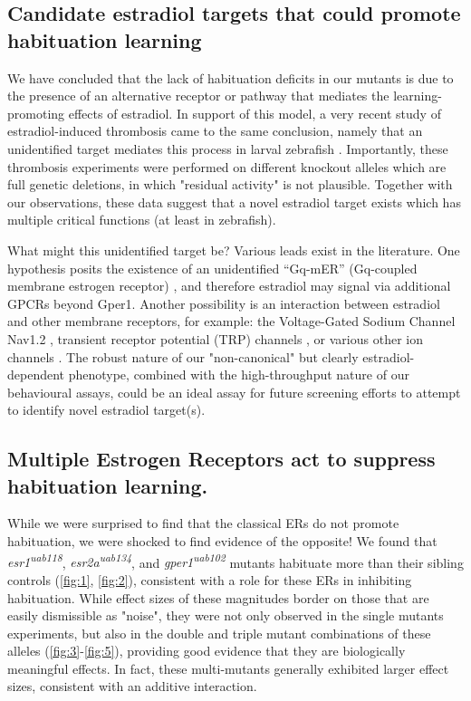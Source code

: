 \documentclass[9.5pt,lineno]{RandlettLab_elife}
\begin{document}
{\subsection{Candidate estradiol targets that could promote habituation learning}

We have concluded that the lack of habituation deficits in our mutants is due to the presence of an alternative receptor or pathway that mediates the learning-promoting effects of estradiol.
In support of this model, a very recent study of estradiol-induced thrombosis came to the same conclusion, namely that an unidentified target mediates this process in larval zebrafish \citep{Yu2024-hr}.
Importantly, these thrombosis experiments were performed on different knockout alleles which are full genetic deletions, in which "residual activity" is not plausible. 
Together with our observations, these data suggest that a novel estradiol target exists which has multiple critical functions (at least in zebrafish). 

What might this unidentified target be? 
Various leads exist in the literature. 
One hypothesis posits the existence of an unidentified “Gq-mER” (Gq-coupled membrane estrogen receptor) \citep{Qiu2006-ml, Vail2019-lx}, and therefore estradiol may signal via additional GPCRs beyond Gper1. 
Another possibility is an interaction between estradiol and other membrane receptors, for example: the Voltage-Gated Sodium Channel Nav1.2 \citep{Sula2021-vs, Trevino2021-wl}, transient receptor potential (TRP) channels \citep{Payrits2017-cd, Ramirez-Barrantes2020-iv}, or various other ion channels \citep{Kow2016-dl}.
The robust nature of our "non-canonical" but clearly estradiol-dependent phenotype, combined with the high-throughput nature of our behavioural assays, could be an ideal assay for future screening efforts to attempt to identify novel estradiol target(s). 

\subsection{Multiple Estrogen Receptors act to suppress habituation learning.}
 
While we were surprised to find that the classical ERs do not promote habituation, we were shocked to find evidence of the opposite!
We found that \emph{esr1\textsuperscript{uab118}}, \emph{esr2a\textsuperscript{uab134}},  and \emph{gper1\textsuperscript{uab102}} mutants habituate more than their sibling controls (\autoref{fig:1}, \autoref{fig:2}), consistent with a role for these ERs in inhibiting habituation.
While effect sizes of these magnitudes border on those that are easily dismissible as "noise", they were not only observed in the single mutants experiments, but also in the double and triple mutant combinations of these alleles (\autoref{fig:3}-\autoref{fig:5}), providing good evidence that they are biologically meaningful effects. 
In fact, these multi-mutants generally exhibited larger effect sizes, consistent with an additive interaction. 
 
}
\end{document}
